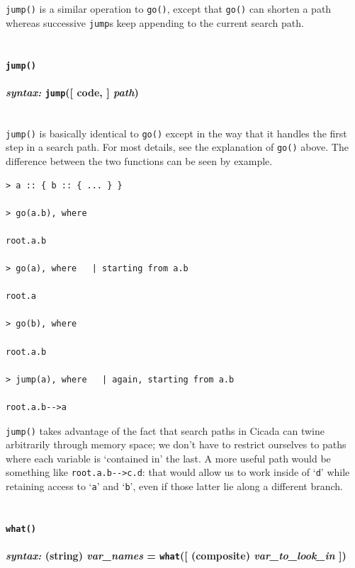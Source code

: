 \documentclass{article}
\newenvironment{code}{
       \begin{list}{}{
               \setlength{\leftmargin}{.4in}
               \setlength{\rightmargin}{0in}
               \setlength{\topsep}{.2in}
       }
       \small
       \item[] }
       { \end{list}   }
\begin{document}
\verb#jump()# is a similar operation to \verb#go()#, except that \verb#go()# can shorten a path whereas successive \verb#jump#s keep appending to the current search path.\\\\





\paragraph{\texttt{jump()}\\\\
\normalfont \emph{syntax: } \texttt{jump}([ code, ] \emph{path})\\\\}

\verb#jump()# is basically identical to \verb#go()# except in the way that it handles the first step in a search path.   For most details, see the explanation of \verb#go()# above.  The difference between the two functions can be seen by example.

\begin{code} \begin{verbatim}
> a :: { b :: { ... } }

> go(a.b), where

root.a.b

> go(a), where   | starting from a.b

root.a

> go(b), where

root.a.b

> jump(a), where   | again, starting from a.b

root.a.b-->a
\end{verbatim} \end{code}

\noindent \verb#jump()# takes advantage of the fact that search paths in Cicada can twine arbitrarily through memory space; we don't have to restrict ourselves to paths where each variable is `contained in' the last.  A more useful path would be something like \verb#root.a.b-->c.d#:  that would allow us to work inside of `\verb#d#' while retaining access to `\verb#a#' and `\verb#b#', even if those latter lie along a different branch.\\\\




\paragraph{\texttt{what()}\\\\
\normalfont \emph{syntax: } (string) \emph{var\_names} = \texttt{what}([ (composite) \emph{var\_to\_look\_in} ])\\\\}
\end{document}
